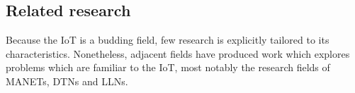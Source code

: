 \subsection{Related research}
\label{subsec:intro_related_fields}
Because the \gls{IoT} is a budding field, few research is explicitly tailored to its characteristics.
Nonetheless, adjacent fields have produced work which explores problems which are familiar to the \gls{IoT}, most notably the research fields of \glspl{MANET}, \glspl{DTN} and \glspl{LLN}.